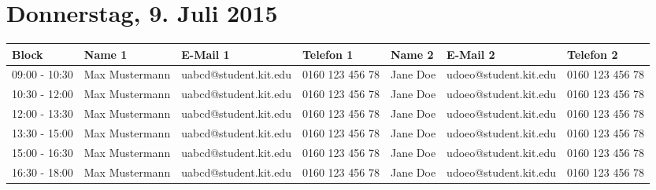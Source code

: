 \documentclass[a4paper, landscape, 12pt]{scrartcl}
\begin{document}
    \section*{Donnerstag, 9. Juli 2015}
    \begin{table}[h]
        \begin{tabular}{l|lll|lll}
        \toprule
        \textbf{Block} & \textbf{Name 1}  & \textbf{E-Mail 1}  & \textbf{Telefon 1}     & \textbf{Name 2} & \textbf{E-Mail 2} & \textbf{Telefon 2}     \\
        \midrule
         09:00 - 10:30 & Max Mustermann      & uabcd@student.kit.edu                  & 0160 123 456 78 & Jane Doe        & udoeo@student.kit.edu                 & 0160 123 456 78  \\
        10:30 - 12:00  & Max Mustermann      & uabcd@student.kit.edu                  & 0160 123 456 78 & Jane Doe        & udoeo@student.kit.edu                 & 0160 123 456 78  \\
        12:00 - 13:30  & Max Mustermann      & uabcd@student.kit.edu                  & 0160 123 456 78 & Jane Doe        & udoeo@student.kit.edu                 & 0160 123 456 78  \\
        13:30 - 15:00  & Max Mustermann      & uabcd@student.kit.edu                  & 0160 123 456 78 & Jane Doe        & udoeo@student.kit.edu                 & 0160 123 456 78  \\
        15:00 - 16:30  & Max Mustermann      & uabcd@student.kit.edu                  & 0160 123 456 78 & Jane Doe        & udoeo@student.kit.edu                 & 0160 123 456 78  \\
        16:30 - 18:00  & Max Mustermann      & uabcd@student.kit.edu                  & 0160 123 456 78 & Jane Doe        & udoeo@student.kit.edu                 & 0160 123 456 78  \\
        \bottomrule
        \end{tabular}
    \end{table}
\end{document}
